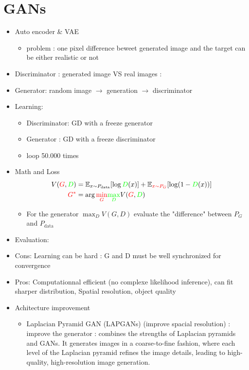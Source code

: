 \documentclass{article}
\theoremstyle{plain}%
\theoremstyle{definition}
\theoremstyle{remark}
\begin{document}
\section{GANs}
\begin{itemize}
    \item Auto encoder \& VAE \begin{itemize}
        \item problem : one pixel difference beweet generated image and the target can be either realistic or not
    \end{itemize}
    \item Discriminator : generated image VS real images :
    \item Generator: random image $\rightarrow$ generation $\rightarrow$ discriminator
    \item Learning: \begin{itemize}
        \item Discriminator: GD with a freeze generator
        \item Generator : GD with a freeze discriminator
        \item loop 50.000 times
    \end{itemize}
    \item Math and Loss \begin{align*}
        V(\textcolor{red}{G}, \textcolor{green}{D}) & = \mathbb{E}_{x\sim P_{\text{data}}}[\log \textcolor{green}{D}(x)] + \mathbb{E}_{\textcolor{red}{x\sim P_G}}[\log(1 - \textcolor{green}{D}(x))] \\
        \textcolor{red}{G^*}                        & = \arg \textcolor{red}{\min_{G}} \textcolor{green}{\max_{D}} V(\textcolor{red}{G}, \textcolor{green}{D})
    \end{align*} \begin{itemize}
        \item For the generator $ \max _D V(G,D) $ evaluate the "difference" between $ P_G $ and $ P_{\text{data}} $
    \end{itemize}
    \item Evaluation:
    \item Cons: Learning can be hard : G and D must be well synchronized for convergence
    \item Pros: Computationnal efficient (no complexe likelihood inference), can fit sharper distribution, Spatial resolution, object quality
    \item Achitecture improvement  \begin{itemize}
        \item Laplacian Pyramid GAN (LAPGANs) (improve spacial resolution) : improve the generator : combines the strengths of Laplacian pyramids and GANs. It generates images in a coarse-to-fine fashion, where each level of the Laplacian pyramid refines the image details, leading to high-quality, high-resolution image generation.

\end{itemize}
\end{itemize}
\end{document}

